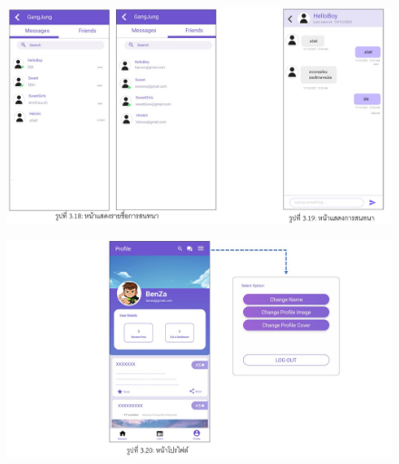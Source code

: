  \begin{figure}
  \begin{center}
    \includegraphics[width=1\textwidth]{./image/reviews/Slide9.JPG}
  \end{center}
  \end{figure}

 \begin{figure}
  \begin{center}
    \includegraphics[width=1\textwidth]{./image/reviews/Slide10.JPG}
  \end{center}
  \end{figure}

